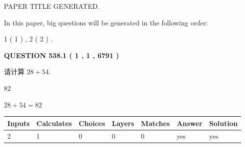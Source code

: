 \documentclass{ctexart}
\begin{document}
   
 \vspace{0.2in}
 
 
 
 
   
   
 PAPER TITLE GENERATED.
   
   
   
\vspace{0.2in}
   
In this paper, big questions will be generated in the following order: 
   
   
   1 ( 1 )
 ,
   2 ( 2 )
 .
  
\vspace{0.2in}
  
{\textbf{\Large{QUESTION
538.1 
 ( 1 , 1 , 6791 )
}}}
  
  
 
请计算 $ %
28 +  %
54 $.
 
 
 
\noindent{}
 
 

82
 
 
\noindent{}
 
 

 
 
 
\noindent{}
 
 

$ %
28 +  %
54=   %
82$
 
 
\noindent{}
 
 

 
   
   
   
   
\noindent\begin{tabular}{|l|l|l|l|l|l|l|}
 \hline
Inputs & Calculates & Choices & Layers & Matches & Answer & Solution \\ \hline
 2  & 
 1  & 
 0
  & 
 0  & 
 0  & 
  yes & 
  yes 
  \\ \hline
 \end{tabular}
   
   
   
   
\noindent{}
   
   
  
\end{document}
